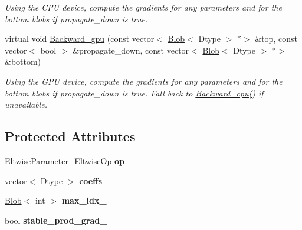 \begin{DoxyCompactItemize}
\begin{DoxyCompactList}\small\item\em Using the C\+PU device, compute the gradients for any parameters and for the bottom blobs if propagate\+\_\+down is true. \end{DoxyCompactList}\item 
\mbox{\label{classcaffe_1_1_eltwise_layer_a105035776ca3c3d81957e86eff6a54b0}} 
virtual void \mbox{\hyperlink{classcaffe_1_1_eltwise_layer_a105035776ca3c3d81957e86eff6a54b0}{Backward\+\_\+gpu}} (const vector$<$ \mbox{\hyperlink{classcaffe_1_1_blob}{Blob}}$<$ Dtype $>$ $\ast$$>$ \&top, const vector$<$ bool $>$ \&propagate\+\_\+down, const vector$<$ \mbox{\hyperlink{classcaffe_1_1_blob}{Blob}}$<$ Dtype $>$ $\ast$$>$ \&bottom)
\begin{DoxyCompactList}\small\item\em Using the G\+PU device, compute the gradients for any parameters and for the bottom blobs if propagate\+\_\+down is true. Fall back to \mbox{\hyperlink{classcaffe_1_1_eltwise_layer_a4d2c0401680daae53654aeb2cc6983a4}{Backward\+\_\+cpu()}} if unavailable. \end{DoxyCompactList}\end{DoxyCompactItemize}
\subsection*{Protected Attributes}
\begin{DoxyCompactItemize}
\item 
\mbox{\label{classcaffe_1_1_eltwise_layer_a31a6111895a4ba616da848bde583f843}} 
Eltwise\+Parameter\+\_\+\+Eltwise\+Op {\bfseries op\+\_\+}
\item 
\mbox{\label{classcaffe_1_1_eltwise_layer_a6e7381feb3aa1c329890d8ba4accd726}} 
vector$<$ Dtype $>$ {\bfseries coeffs\+\_\+}
\item 
\mbox{\label{classcaffe_1_1_eltwise_layer_a78bfc2935ecc0ff3bdfef865afd4b7b5}} 
\mbox{\hyperlink{classcaffe_1_1_blob}{Blob}}$<$ int $>$ {\bfseries max\+\_\+idx\+\_\+}
\item 
\mbox{\label{classcaffe_1_1_eltwise_layer_a94a93d8257e6b36431e83cc3a030e904}} 
bool {\bfseries stable\+\_\+prod\+\_\+grad\+\_\+}
\end{DoxyCompactItemize}


